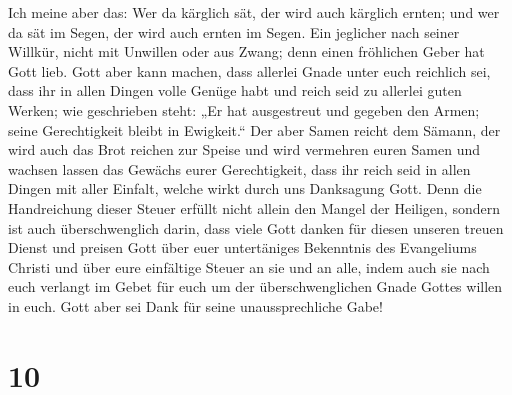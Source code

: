  Ich meine aber das: Wer da kärglich sät, der wird auch
kärglich ernten; und wer da sät im Segen, der wird auch ernten im Segen.
 Ein jeglicher nach seiner Willkür, nicht mit Unwillen
oder aus Zwang; denn einen fröhlichen Geber hat Gott lieb.
 Gott aber kann machen, dass allerlei Gnade unter euch
reichlich sei, dass ihr in allen Dingen volle Genüge habt und reich seid
zu allerlei guten Werken;  wie geschrieben steht: „Er hat
ausgestreut und gegeben den Armen; seine Gerechtigkeit bleibt in
Ewigkeit.``  Der aber Samen reicht dem Sämann, der wird
auch das Brot reichen zur Speise und wird vermehren euren Samen und
wachsen lassen das Gewächs eurer Gerechtigkeit,  dass ihr
reich seid in allen Dingen mit aller Einfalt, welche wirkt durch uns
Danksagung Gott.  Denn die Handreichung dieser Steuer
erfüllt nicht allein den Mangel der Heiligen, sondern ist auch
überschwenglich darin, dass viele Gott danken für diesen unseren treuen
Dienst  und preisen Gott über euer untertäniges
Bekenntnis des Evangeliums Christi und über eure einfältige Steuer an
sie und an alle,  indem auch sie nach euch verlangt im
Gebet für euch um der überschwenglichen Gnade Gottes willen in euch.
 Gott aber sei Dank für seine unaussprechliche Gabe!

\hypertarget{section-9}{%
\section{10}\label{section-9}}

